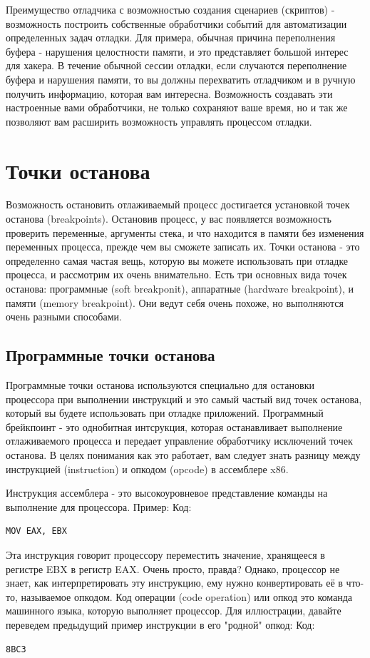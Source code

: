 \documentclass[12pt]{book}
\begin{document}
Преимущество отладчика с возможностью создания сценариев (скриптов) - возможность построить собственные обработчики событий для автоматизации определенных задач отладки. Для примера, обычная причина переполнения буфера - нарушения целостности памяти, и это представляет большой интерес для хакера. В течение обычной сессии отладки, если случаются переполнение буфера и нарушения памяти, то вы должны перехватить отладчиком и в ручную получить информацию, которая вам интересна. Возможность создавать эти настроенные вами обработчики, не только сохраняют ваше время, но и так же позволяют вам расширить возможность управлять процессом отладки.


\section{Точки останова}

Возможность остановить отлаживаемый процесс достигается установкой точек останова (breakpoints). Остановив процесс, у вас появляется возможность проверить переменные, аргументы стека, и что находится в памяти без изменения переменных процесса, прежде чем вы сможете записать их. Точки останова - это определенно самая частая вещь, которую вы можете использовать при отладке процесса, и рассмотрим их очень внимательно. Есть три основных вида точек останова: программные (soft breakponit), аппаратные (hardware breakpoint), и памяти (memory breakpoint). Они ведут себя очень похоже, но выполняются очень разными способами.

\subsection{Программные точки останова}

Программные точки останова используются специально для остановки процессора при выполнении инструкций и это самый частый вид точек останова, который вы будете использовать при отладке приложений. Программный брейкпоинт - это однобитная интсрукция, которая останавливает выполнение отлаживаемого процесса и передает управление обработчику исключений точек останова. В целях понимания как это работает, вам следует знать разницу между инструкцией (instruction) и опкодом (opcode) в ассемблере x86.

Инструкция ассемблера - это высокоуровневое представление команды на выполнение для процессора. Пример:
Код:
\begin{lstlisting}
MOV EAX, EBX
\end{lstlisting}
Эта инструкция говорит процессору переместить значение, хранящееся в регистре EBX в регистр EAX. Очень просто, правда? Однако, процессор не знает, как интерпретировать эту инструкцию, ему нужно конвертировать её в что-то, называемое опкодом. Код операции (code operation) или опкод это команда машинного языка, которую выполняет процессор. Для иллюстрации, давайте переведем предыдущий пример инструкции в его "родной" опкод:
Код:
\begin{lstlisting}
8BC3
\end{lstlisting}
\end{document}
